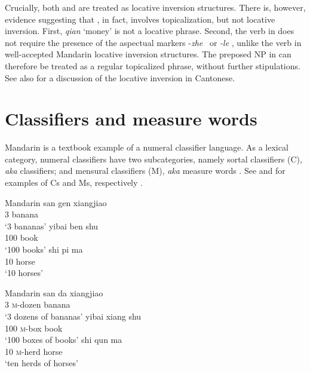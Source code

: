 \documentclass[output=paper,chinesefont,hidelinks]{langscibook}
\begin{document}
\noindent Crucially, both  and  are treated as locative inversion structures. There is, however, evidence suggesting that , in fact, involves topicalization, but not locative inversion. First, \textit{qian} `money' is not a locative phrase. Second, the verb in  does not require the presence of the aspectual markers -\textit{zhe} \DUR\ or \textit{-le} \PRF, unlike the verb in well-accepted Mandarin locative inversion structures. The preposed NP in  can therefore be treated as a regular topicalized phrase, without further stipulations. See also \citet{Lui2020} for a discussion of the locative inversion in Cantonese.

\section{Classifiers and measure words}
\label{sec:Sinitic:4.6}

Mandarin is a textbook example of a numeral classifier language. As a lexical category, numeral classifiers have two subcategories, namely sortal classifiers (C), \textit{aka} classifiers; and mensural classifiers (M), \textit{aka} measure words \citep{HuangShi2016}. See  and  for examples of Cs and Ms, respectively \citep{Her2012b}.

\ea%
    \label{ex:Sinitic:59}Mandarin
\ea    \gll san  gen  xiangjiao \\
         3  {\CLF}  banana\\
    \glt`3 bananas'
\ex    \gll yibai  ben  shu\\
         100  {\CLF}  book\\
    \glt`100 books'
\ex    \gll shi  pi  ma\\
         10  {\CLF}  horse\\
    \glt`10 horses'
    \z\z

\ea%
    \label{ex:Sinitic:60}Mandarin
\ea    \gll san  da            xiangjiao\\
         3 \textsc{m}-dozen  banana\\
    \glt `3 dozens of bananas'
\ex    \gll yibai  xiang  shu\\
         100  \textsc{m}-box  book\\
    \glt `100 boxes of books'
\ex    \gll shi  qun        ma\\
         10  \textsc{m}-herd    horse\\
    \glt `ten herds of horses'
    \z\z
\end{document}
